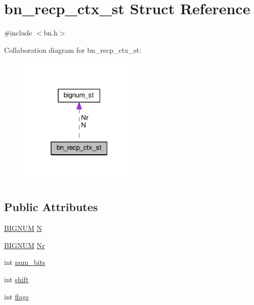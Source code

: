 \hypertarget{structbn__recp__ctx__st}{}\section{bn\+\_\+recp\+\_\+ctx\+\_\+st Struct Reference}
\label{structbn__recp__ctx__st}


{\ttfamily \#include $<$bn.\+h$>$}



Collaboration diagram for bn\+\_\+recp\+\_\+ctx\+\_\+st\+:
\nopagebreak
\begin{figure}[H]
\begin{center}
\leavevmode
\includegraphics[width=163pt]{structbn__recp__ctx__st__coll__graph}
\end{center}
\end{figure}
\subsection*{Public Attributes}
\begin{DoxyCompactItemize}
\item 
\hyperlink{ossl__typ_8h_a6fb19728907ec6515e4bfb716bffa141}{B\+I\+G\+N\+UM} \hyperlink{structbn__recp__ctx__st_ab52e6e895e525fba79d3a18ef2b3dcb8}{N}
\item 
\hyperlink{ossl__typ_8h_a6fb19728907ec6515e4bfb716bffa141}{B\+I\+G\+N\+UM} \hyperlink{structbn__recp__ctx__st_a2e7a01e3de39b7998cd21792a0b87565}{Nr}
\item 
int \hyperlink{structbn__recp__ctx__st_a685ffc37ed182cdebd42f2382f552cab}{num\+\_\+bits}
\item 
int \hyperlink{structbn__recp__ctx__st_ac74357f903a13ec4404d8e0a2d752ec7}{shift}
\item 
int \hyperlink{structbn__recp__ctx__st_acc82125c857d066e9f20f779d0a2ba3e}{flags}
\end{DoxyCompactItemize}


